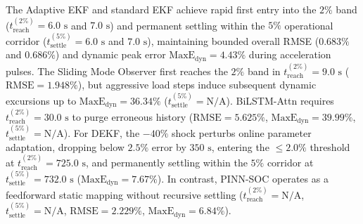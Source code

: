\documentclass[preprint,12pt]{elsarticle}
\begin{document}
The Adaptive EKF and standard EKF achieve rapid first entry into the $2\%$ band ($t_{\text{reach}}^{(2\%)} = 6.0\text{ s}$ and $7.0\text{ s}$) and permanent settling within the $5\%$ operational corridor ($t_{\text{settle}}^{(5\%)} = 6.0\text{ s}$ and $7.0\text{ s}$), maintaining bounded overall RMSE ($0.683\%$ and $0.686\%$) and dynamic peak error $\text{MaxE}_{\text{dyn}} = 4.43\%$ during acceleration pulses. The Sliding Mode Observer first reaches the $2\%$ band in $t_{\text{reach}}^{(2\%)} = 9.0\text{ s}$ ($\text{RMSE} = 1.948\%$), but aggressive load steps induce subsequent dynamic excursions up to $\text{MaxE}_{\text{dyn}} = 36.34\%$ ($t_{\text{settle}}^{(5\%)} = \text{N/A}$). BiLSTM-Attn requires $t_{\text{reach}}^{(2\%)} = 30.0\text{ s}$ to purge erroneous history ($\text{RMSE} = 5.625\%$, $\text{MaxE}_{\text{dyn}} = 39.99\%$, $t_{\text{settle}}^{(5\%)} = \text{N/A}$). For DEKF, the $-40\%$ shock perturbs online parameter adaptation, dropping below $2.5\%$ error by $350\text{ s}$, entering the $\le 2.0\%$ threshold at $t_{\text{reach}}^{(2\%)} = 725.0\text{ s}$, and permanently settling within the $5\%$ corridor at $t_{\text{settle}}^{(5\%)} = 732.0\text{ s}$ ($\text{MaxE}_{\text{dyn}} = 7.67\%$). In contrast, PINN-SOC operates as a feedforward static mapping without recursive settling ($t_{\text{reach}}^{(2\%)} = \text{N/A}$, $t_{\text{settle}}^{(5\%)} = \text{N/A}$, $\text{RMSE} = 2.229\%$, $\text{MaxE}_{\text{dyn}} = 6.84\%$).

\begin{table}[htbp]
\caption{Convergence metrics under initial state uncertainty [Tier~2 Co-Simulation] ($-40\%$ initial SOC error into $\le 2\%$ tolerance band and $\le 5\%$ operational corridor)\label{tab:4_conv}}
%
\end{table}
\end{document}
